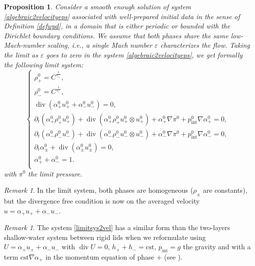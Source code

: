 \documentclass[11pt, twoside, a4paper]{article}
\theoremstyle{plain}
\newtheorem{proposition}[theorem]{Proposition}
\theoremstyle{remark}
\newtheorem{remark}[theorem]{Remark}
\numberwithin{equation}{section}
\renewcommand{\div}{\operatorname{div}}
\renewcommand{\epsilon}{\varepsilon}
\newcommand{\dt}{\partial_t}
\newcommand{\eps}{\varepsilon}
\newcommand{\ap}{\alpha_+}
\newcommand{\am}{\alpha_-}
\newcommand{\rp}{\rho_+}
\newcommand{\rmi}{\rho_-}
\newcommand{\gp}{\gamma_{+}}
\newcommand{\gm}{\gamma_-}
\begin{document}
\begin{proposition} 
Consider a smooth enough solution of system \eqref{algebraic2velocityeps} associated with well-prepared initial data in the sense of Definition \eqref{defwpd}, in a domain that is either periodic or bounded with the Dirichlet boundary conditions. We assume that both phases share the same low-Mach-number scaling, i.e., a single Mach number $\epsilon$ characterizes the flow. Taking the limit as $\eps$ goes to zero in the system \eqref{algebraic2velocityeps}, we get formally the following limit system:
\begin{equation}\label{limitsys2vel}
    \begin{cases}
        \rp^0 = C^{\frac{1}{\gp}},\\
        \rmi^0 = C^{\frac{1}{\gm}},\\
        \div (\ap^0 u_+^0 +\am^0 u_-^0) = 0,\\
        \dt (\ap^0\rp^0 u_+^0) + \div (\ap^0\rp^0 u_+^0 \otimes u_+^0) + \ap^0 \nabla \pi^0 + p_{\mathrm{int}}^0 \nabla \ap^0 = 0,\\
        \dt(\am^0 \rmi^0 u_-^0) + \div (\am^0 \rmi^0 u_-^0 \otimes  u_-^0) + \am^0 \nabla \pi^0 + p_{\mathrm{int}}^0 \nabla \am^0 = 0,\\
        \dt \alpha_\pm^0 + \div (\alpha_\pm^0 u_\pm^0) =0,\\
        \ap^0 + \am^0 = 1.\\
    \end{cases}
\end{equation}
with $\pi^0$ the limit pressure.
\end{proposition}

\begin{remark}
In the limit system, both phases are homogeneous ($\rho_\pm$ are constants), but the divergence free condition is now on the averaged velocity $u=\ap u_+ + \am u_-$.
\end{remark}

\begin{remark}
The system \eqref{limitsys2vel} has a similar form than the two-layers shallow-water system between rigid lids when we reformulate using $U=\ap u_+ + \am u_-$ with $\div U =0$, $h_++h_-=\text{cst}$, $p_{\mathrm{int}}=g$ the gravity and with a term $\text{cst} \nabla \ap$ in the momentum equation of phase $+$ (see \cite{bresch2011well}).
\end{remark}
\end{document}
